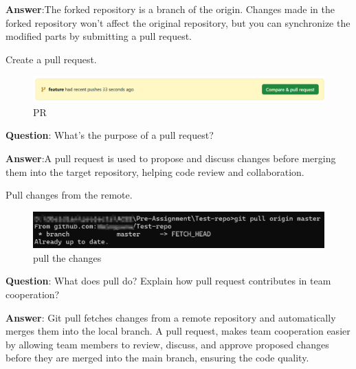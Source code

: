 \documentclass{article}
\begin{document}
\textbf{Answer}:The forked repository is a branch of the origin. Changes made in the forked repository won't affect the original repository, but you can synchronize the modified parts by submitting a pull request.

Create a pull request.
\begin{figure}[H]
\centering
\includegraphics[width = \textwidth]{../figures/PR2.png}
\caption{PR}
\end{figure}
\textbf{Question}: What's the purpose of a pull request?

\textbf{Answer}:A pull request is used to propose and discuss changes before merging them into the target repository, helping code review and collaboration.

Pull changes from the remote.
\begin{figure}[H]
\centering
\includegraphics[width = \textwidth]{../figures/pull.png}
\caption{pull the changes}
\end{figure}
\textbf{Question}: What does pull do? Explain how pull request contributes in team cooperation?

\textbf{Answer}: Git pull fetches changes from a remote repository and automatically merges them into the local branch.
A pull request, makes team cooperation easier by allowing team members to review, discuss, and approve proposed changes before they are merged into the main branch,
ensuring the code quality.
\end{document}
